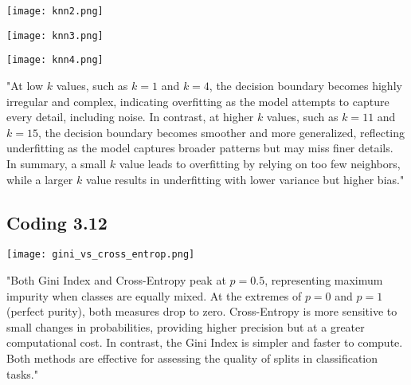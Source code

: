 \documentclass[12pt]{article}
\begin{document}
\begin{center}
  \texttt{[image: knn2.png]}
\end{center}

\begin{center}
  \texttt{[image: knn3.png]}
\end{center}

\begin{center}
  \texttt{[image: knn4.png]}
\end{center}
"At low \(k\) values, such as \(k=1\) and \(k=4\), the decision boundary becomes highly irregular and complex, indicating overfitting as the model attempts to capture every detail, including noise. In contrast, at higher \(k\) values, such as \(k=11\) and \(k=15\), the decision boundary becomes smoother and more generalized, reflecting underfitting as the model captures broader patterns but may miss finer details.\\

In summary, a small \(k\) value leads to overfitting by relying on too few neighbors, while a larger \(k\) value results in underfitting with lower variance but higher bias."\\
\subsection{Coding 3.12}
\begin{center}
  \texttt{[image: gini\_vs\_cross\_entrop.png]}
\end{center}
"Both Gini Index and Cross-Entropy peak at \(p=0.5\), representing maximum impurity when classes are equally mixed. At the extremes of \(p=0\) and \(p=1\) (perfect purity), both measures drop to zero. Cross-Entropy is more sensitive to small changes in probabilities, providing higher precision but at a greater computational cost. In contrast, the Gini Index is simpler and faster to compute. Both methods are effective for assessing the quality of splits in classification tasks." 
\end{document}
